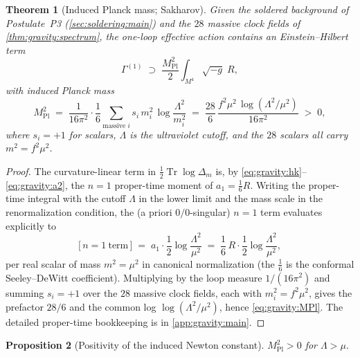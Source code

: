 \documentclass[11pt]{article}
\theoremstyle{plain}
\newtheorem{theorem}{Theorem}[section]
\newtheorem{proposition}[theorem]{Proposition}
\theoremstyle{definition}
\theoremstyle{remark}
\newcommand{\Tr}{\operatorname{Tr}}
\begin{document}
\begin{theorem}[Induced Planck mass; Sakharov]
\label{thm:gravity:planck}
\label{thm:gravity:MPl}
\label{thm:GravitySummary}
Given the soldered background of Postulate~P3 (\autoref{sec:soldering:main})
and the $28$ massive clock fields of \autoref{thm:gravity:spectrum}, the
one-loop effective action contains an Einstein--Hilbert term
\begin{equation}\label{eq:gravity:EH}
  \Gamma^{(1)} \;\supset\;
  \frac{M_{\mathrm{Pl}}^{2}}{2}\int_{M^{4}}\!\sqrt{-g}\;R,
\end{equation}
with induced Planck mass
\begin{equation}\label{eq:gravity:MPl}
  M_{\mathrm{Pl}}^{2}
  \;=\;
  \frac{1}{16\pi^{2}}\cdot\frac{1}{6}
  \sum_{\text{massive } i} s_{i}\, m_{i}^{2}\,\log\frac{\Lambda^{2}}{m_{i}^{2}}
  \;=\;
  \frac{28}{6}\,
  \frac{f^{2}\mu^{2}\,\log(\Lambda^{2}/\mu^{2})}{16\pi^{2}}
  \;>\; 0 ,
\end{equation}
where $s_{i}=+1$ for scalars, $\Lambda$ is the ultraviolet cutoff, and the
$28$ scalars all carry $m^{2}=f^{2}\mu^{2}$.
\end{theorem}

\begin{proof}
The curvature-linear term in $\tfrac12\Tr\log\Delta_{m}$ is, by
\eqref{eq:gravity:hk}--\eqref{eq:gravity:a2}, the $n=1$ proper-time moment
of $a_{1}=\tfrac16 R$. Writing the proper-time integral with the cutoff
$\Lambda$ in the lower limit and the mass scale in the renormalization
condition, the (a priori $0/0$-singular) $n=1$ term evaluates explicitly to
\begin{equation}\label{eq:gravity:n1}
  \bigl[\,n=1\ \text{term}\,\bigr]
  \;=\;
  a_{1}\cdot\frac12\log\frac{\Lambda^{2}}{\mu^{2}}
  \;=\;
  \frac{1}{6}\,R\cdot\frac12\log\frac{\Lambda^{2}}{\mu^{2}},
\end{equation}
per real scalar of mass $m^{2}=\mu^{2}$ in canonical normalization (the
$\tfrac16$ is the conformal Seeley--DeWitt coefficient). Multiplying by the
loop measure $1/(16\pi^{2})$ and summing $s_{i}=+1$ over the $28$ massive
clock fields, each with $m_{i}^{2}=f^{2}\mu^{2}$, gives the prefactor
$28/6$ and the common log $\log(\Lambda^{2}/\mu^{2})$, hence
\eqref{eq:gravity:MPl}. The detailed proper-time bookkeeping is in
\autoref{app:gravity:main}.
\end{proof}

\begin{proposition}[Positivity of the induced Newton constant]
\label{prop:gravity:positivity}
$M_{\mathrm{Pl}}^{2}>0$ for $\Lambda>\mu$.
\end{proposition}
\end{document}
